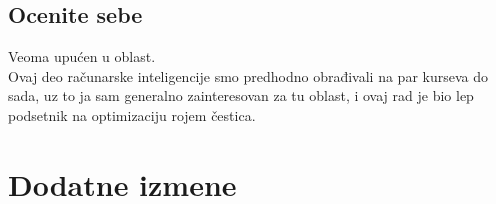 \documentclass[a4paper]{report}
\begin{document}
\section{Ocenite sebe}
Veoma upućen u oblast. \\ Ovaj deo računarske inteligencije smo predhodno obrađivali na par kurseva do sada, uz to ja 
sam generalno zainteresovan za tu oblast, i ovaj rad je bio lep podsetnik na optimizaciju rojem čestica.



\chapter{Dodatne izmene}
\end{document}
